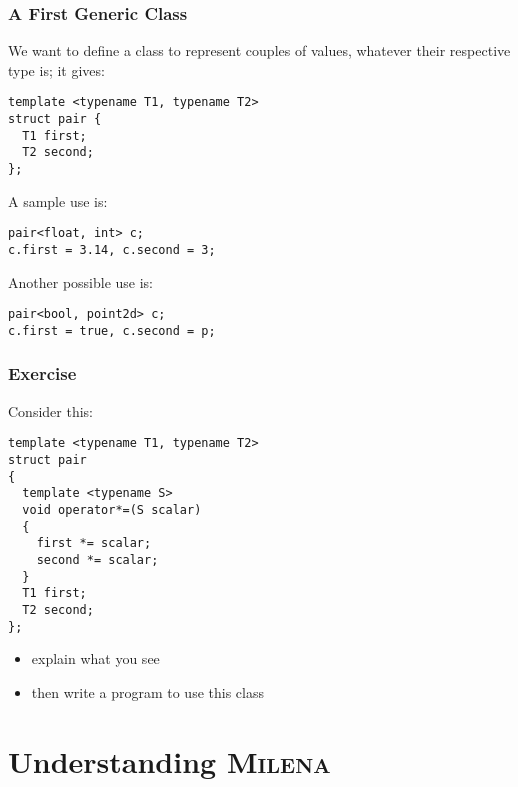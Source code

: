 \documentclass{beamer}
\newcommand{\mln}{\textsc{Milena}\xspace}
\begin{document}
\begin{frame}[fragile]
  \frametitle{A First Generic Class}

  We want to define a class to represent couples of values, whatever
  their respective type is; it gives:

\begin{lstlisting}
template <typename T1, typename T2>
struct pair {
  T1 first;
  T2 second;
};
\end{lstlisting}

\smallskip

A sample use is:
\begin{lstlisting}
pair<float, int> c;
c.first = 3.14, c.second = 3; 
\end{lstlisting}

Another possible use is:
\begin{lstlisting}
pair<bool, point2d> c;
c.first = true, c.second = p; 
\end{lstlisting}

\end{frame}


\begin{frame}[fragile]
  \frametitle{Exercise}

Consider this:
\begin{lstlisting}
template <typename T1, typename T2>
struct pair
{
  template <typename S>
  void operator*=(S scalar)
  {
    first *= scalar;
    second *= scalar;
  }
  T1 first;
  T2 second;
};
\end{lstlisting}

\smallskip

\begin{itemize}
\item explain what you see
\item then write a program to use this class
\end{itemize}

\end{frame}




\section{Understanding \mln}
\end{document}
